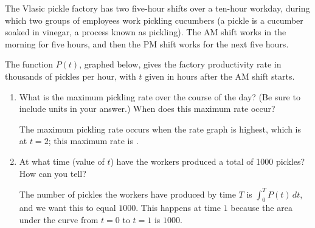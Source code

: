 \documentclass{article}
\begin{document}
\begin{enumerate}
    The Vlasic pickle factory has two five-hour shifts over a ten-hour
    workday, during which two groups of employees work pickling cucumbers (a
    pickle is a cucumber soaked in vinegar, a process known as
    pickling). The AM shift works in the morning for five hours, and then
    the PM shift works for the next five hours.

    The function $P(t)$, graphed below, gives the factory productivity
    rate in thousands of pickles per hour, with $t$ given in hours after
    the AM shift starts.
    \begin{center}
    \end{center}

    \begin{enumerate}

    \item
      \begin{problem}[\vfill]
        What is the maximum pickling rate over the course of the day? (Be
        sure to include units in your answer.)  When does this maximum rate
        occur?
      \end{problem}

      \begin{solution}
        The maximum pickling rate occurs when the rate graph is highest,
        which is at $\boxed{t = 2}$; this maximum rate is .
      \end{solution}

    \item
      \begin{problem}[\vfill]
        At what time (value of $t$) have the workers produced a total of
        1000 pickles? How can you tell?
      \end{problem}

      \begin{solution}
        The number of pickles the workers have produced by time $T$ is
        $\displaystyle \int_0^T P(t)\,dt$, and we want this to equal
        $1000$.  This happens at time $\boxed{1}$ because the area under the
        curve from $t = 0$ to $t = 1$ is $1000$.  
      \end{solution}


\end{enumerate}
\end{enumerate}
\end{document}
